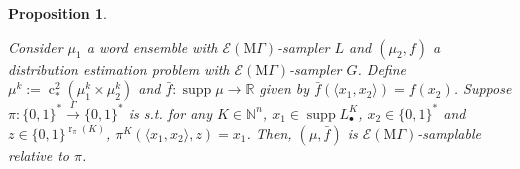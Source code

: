 \documentclass{article}
\numberwithin{equation}{section}
\theoremstyle{definition}
\theoremstyle{plain}
\newtheorem{proposition}{Proposition}[section]
\newcommand{\Bool}{\{0,1\}}
\newcommand{\Words}{{\Bool^*}}
\DeclareMathOperator{\Supp}{supp}
\DeclareMathOperator{\R}{r}
\DeclareMathOperator{\En}{c}
\newcommand{\Nats}{\mathbb{N}}
\newcommand{\Reals}{\mathbb{R}}
\newcommand{\Chev}[1]{\langle #1 \rangle}
\newcommand{\MGrow}{\mathrm{M}\Gamma}
\newcommand{\Fall}{\mathcal{E}}
\newcommand{\EMG}{\Fall(\MGrow)}
\newcommand{\Scheme}{\xrightarrow{\Gamma}}
\begin{document}
\begin{samepage}
\begin{proposition}
\label{prp:thm__mult__cond3}

Consider $\mu_1$ a word ensemble with $\EMG$-sampler $L$ and $(\mu_2, f)$ a distribution estimation problem with $\EMG$-sampler $G$. Define ${\mu^k:=\En_*^2(\mu_1^k \times \mu_2^k)}$ and $\bar{f}: \Supp \mu \rightarrow \Reals$ given by ${\bar{f}(\Chev{x_1,x_2})=f(x_2)}$. Suppose $\pi: \Words \Scheme \Words$ is s.t. for any $K \in \Nats^n$, ${x_1 \in \Supp L_\bullet^{K}}$, $x_2 \in \Words$ and $z \in \Bool^{\R_\pi(K)}$, $\pi^{K}(\Chev{x_1,x_2},z)=x_1$. Then, $(\mu,\bar{f})$ is $\EMG$-samplable relative to $\pi$.

\end{proposition}
\end{samepage}
\end{document}
